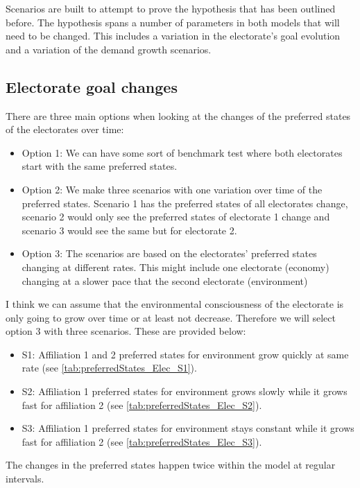 \documentclass[12pt]{article}
\begin{document}
Scenarios are built to attempt to prove the hypothesis that has been outlined before. The hypothesis spans a number of parameters in both models that will need to be changed. This includes a variation in the electorate's goal evolution and a variation of the demand growth scenarios.

\subsection{Electorate goal changes}

There are three main options when looking at the changes of the preferred states of the electorates over time:

\begin{itemize}
\item Option 1: We can have some sort of benchmark test where both electorates start with the same preferred states.
\item Option 2: We make three scenarios with one variation over time of the preferred states. Scenario 1 has the preferred states of all electorates change, scenario 2 would only see the preferred states of electorate 1 change and scenario 3 would see the same but for electorate 2.
\item Option 3: The scenarios are based on the electorates' preferred states changing at different rates. This might include one electorate (economy) changing at a slower pace that the second electorate (environment)
\end{itemize}

I think we can assume that the environmental consciousness of the electorate is only going to grow over time or at least not decrease. Therefore we will select option 3 with three scenarios. These are provided below:

\begin{itemize}
\item S1: Affiliation 1 and 2 preferred states for environment grow quickly at same rate (see \autoref{tab:preferredStates_Elec_S1}).
\item S2: Affiliation 1 preferred states for environment grows slowly while it grows fast for affiliation 2 (see \autoref{tab:preferredStates_Elec_S2}).
\item S3: Affiliation 1 preferred states for environment stays constant while it grows fast for affiliation 2 (see \autoref{tab:preferredStates_Elec_S3}).
\end{itemize}

The changes in the preferred states happen twice within the model at regular intervals.
\end{document}
